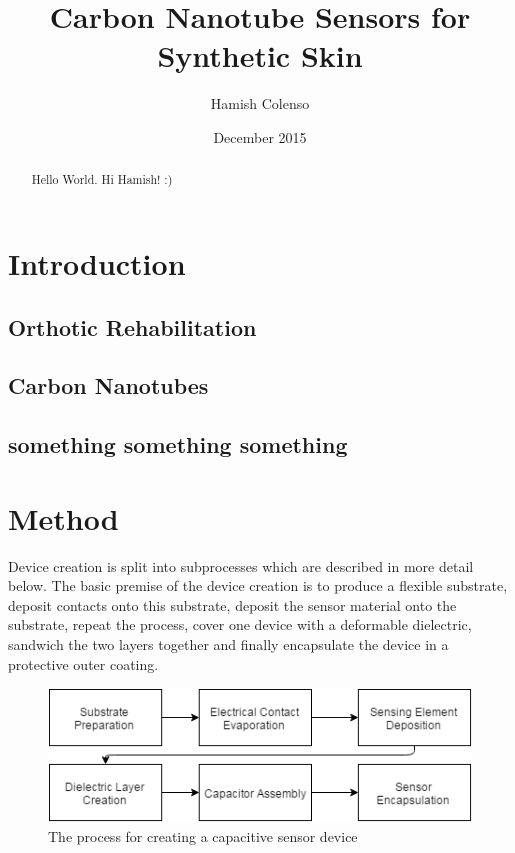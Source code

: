 \documentclass[11pt,twoside,a4paper]{article}
\begin{document}
	\title{Carbon Nanotube Sensors for Synthetic Skin}
	\author{Hamish Colenso}
	\date{December 2015}
	\maketitle
	
	\begin{abstract}
		Hello World.
		Hi Hamish! :)
	\end{abstract}
	
	\newpage
	\section{Introduction}
		\subsection{Orthotic Rehabilitation}
		\subsection{Carbon Nanotubes}
		\subsection{something something something}
	\newpage
	\section{Method}
		Device creation is split into subprocesses which are described in more detail below. The basic premise of the device creation is to produce a flexible substrate, deposit contacts 			onto this substrate, deposit the sensor material onto the substrate, repeat the process, cover one device with a deformable dielectric, sandwich the two layers together and 			finally encapsulate the device in a protective outer coating. 
		\newline
		\begin{figure}[H]
			\centering
			\includegraphics[scale=.8]{ProcessDiagram}
			\caption{The process for creating a capacitive sensor device}
		\end{figure}
\end{document}
